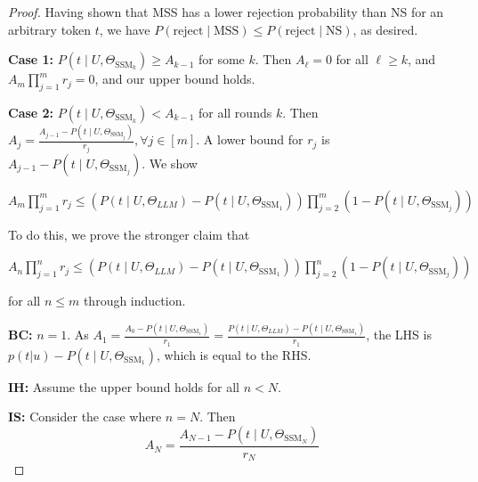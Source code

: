 \begin{proof}
Having shown that MSS has a lower rejection probability than NS for an arbitrary token $t$, we have $P(\textrm{reject}\mid \textrm{MSS}) \leq P(\textrm{reject}\mid\textrm{NS})$, as desired.
\fi

\textbf{Case 1:} $P(t \mid U, \Theta_{\textrm{SSM}_k}) \geq A_{k-1}$ for some $k$. Then $A_{\ell} = 0$ for all $\ell \geq k$, and $A_{m}\prod_{j=1}^m r_j = 0$, and our upper bound holds.

\textbf{Case 2:} $P(t \mid U, \Theta_{\textrm{SSM}_k}) < A_{k-1}$ for all rounds $k$. Then $A_{j} = \frac{A_{j-1}-P(t \mid U, \Theta_{\textrm{SSM}_j})}{r_j}, \forall j \in [m]$. A lower bound for $r_j$ is $A_{j-1} - P(t \mid U, \Theta_{\textrm{SSM}_j})$. We show 

$
A_{m}\prod_{j=1}^m r_j \leq (P(t \mid U, \Theta_{LLM}) -P(t \mid U, \Theta_{\textrm{SSM}_1}))\prod_{j=2}^m (1-P(t \mid U, \Theta_{\textrm{SSM}_j}))   
$

To do this, we prove the stronger claim that 

$
 A_{n} \prod_{j=1}^n r_j \leq (P(t \mid U, \Theta_{LLM}) -P(t \mid U, \Theta_{\textrm{SSM}_1}))\prod_{j=2}^n (1-P(t \mid U, \Theta_{\textrm{SSM}_j}))
$

for all $n \leq m$ through induction.

\textbf{BC:} $n=1$. As $A_1 = \frac{A_0 - P(t \mid U, \Theta_{\textrm{SSM}_1})}{r_1} = \frac{P(t \mid U, \Theta_{LLM})-P(t \mid U, \Theta_{\textrm{SSM}_1})}{r_1}$, the LHS is $p(t|u) - P(t \mid U, \Theta_{\textrm{SSM}_1})$, which is equal to the RHS.

\textbf{IH:} Assume the upper bound holds for all $n < N$.

\textbf{IS:} Consider the case where $n = N$. Then
\[
A_{N} = \frac{A_{N-1} - P(t \mid U, \Theta_{\textrm{SSM}_N})}{r_N}
\]


\end{proof}
